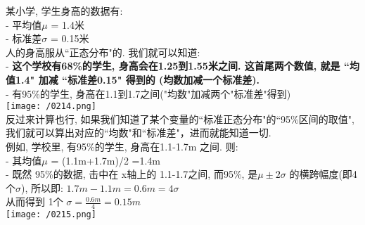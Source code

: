 \documentclass[UTF8]{ctexart}
\begin{document}
\begin{myEnvSample}
	某小学, 学生身高的数据有: \\
	- 平均值$\mu$ = 1.4米 \\
	- 标准差$\sigma$ = 0.15米 \\
	
	人的身高服从``正态分布"的. 我们就可以知道: \\
	- \textbf{这个学校有68\%的学生, 身高会在1.25到1.55米之间. 这首尾两个数值, 就是 ``均值1.4" 加减 ``标准差0.15" 得到的 (均数加减一个标准差).} \\
	- 有95\%的学生, 身高在1.1到1.7之间("均数"加减两个"标准差"得到) \\
	
	\texttt{[image: /0214.png]} \\
	
	
	反过来计算也行, 如果我们知道了某个变量的``标准正态分布"的``95\%区间的取值", 我们就可以算出对应的``均数"和``标准差"，进而就能知道一切. \\
	
	例如, 学校里, 有95\%的学生, 身高在1.1-1.7m 之间. 则: \\
	- 其均值$\mu$ = (1.1m+1.7m)/2 =1.4m \\
	- 既然 95\%的数据, 击中在 x轴上的 1.1-1.7之间, 而95\%, 是$\mu \pm 2\sigma$ 的横跨幅度(即4个$\sigma$), 所以即: $1.7m-1.1m=0.6m=4\sigma $ \\
	从而得到 1个 $\sigma =\frac{0.6m}{4}=0.15m	$ \\
	
	\texttt{[image: /0215.png]} 
\end{myEnvSample}
\end{document}
